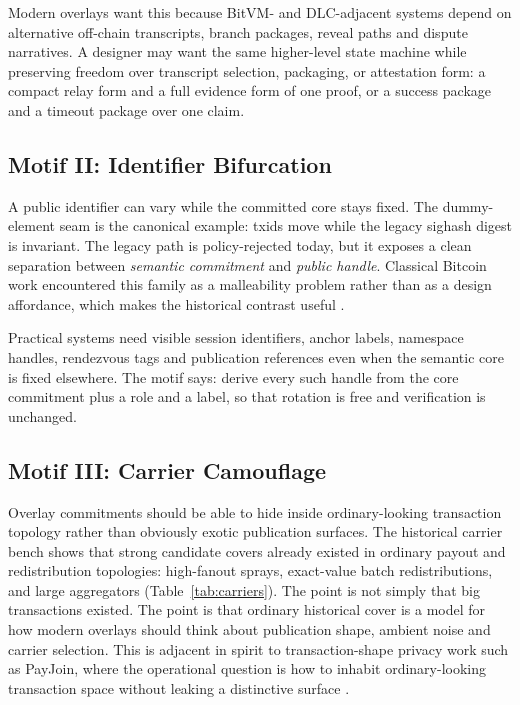 \documentclass[11pt]{article}
\begin{document}
Modern overlays want this because BitVM- and DLC-adjacent systems depend on
alternative off-chain transcripts, branch packages, reveal paths and dispute
narratives. A designer may want the same higher-level state machine while
preserving freedom over transcript selection, packaging, or attestation form:
a compact relay form and a full evidence form of one proof, or a success
package and a timeout package over one claim.

\subsection{Motif II: Identifier Bifurcation}

A public identifier can vary while the committed core stays fixed. The
dummy-element seam is the canonical example: txids move while the legacy
sighash digest is invariant. The legacy path is policy-rejected today, but it
exposes a clean separation between \emph{semantic commitment} and
\emph{public handle}. Classical Bitcoin work encountered this family as a
malleability problem rather than as a design affordance, which makes the
historical contrast useful \cite{andrychowicz2013malleability,decker2014malleability}.

Practical systems need visible session identifiers, anchor labels, namespace
handles, rendezvous tags and publication references even when the semantic core
is fixed elsewhere. The motif says: derive every such handle from the core
commitment plus a role and a label, so that rotation is free and verification is
unchanged.

\subsection{Motif III: Carrier Camouflage}

Overlay commitments should be able to hide inside ordinary-looking transaction
topology rather than obviously exotic publication surfaces. The historical
carrier bench shows that strong candidate covers already existed in ordinary
payout and redistribution topologies: high-fanout sprays, exact-value batch
redistributions, and large aggregators (Table~\ref{tab:carriers}). The point is
not simply that big transactions existed. The point is that ordinary historical
cover is a model for how modern overlays should think about publication shape,
ambient noise and carrier selection. This is adjacent in spirit to
transaction-shape privacy work such as PayJoin, where the operational question
is how to inhabit ordinary-looking transaction space without leaking a
distinctive surface \cite{bip78,ghesmati2022payjoin}.
\end{document}
